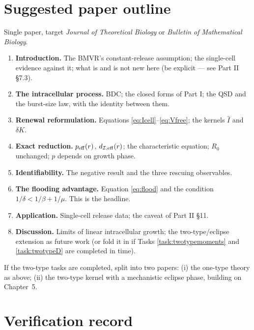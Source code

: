 \documentclass[11pt]{article}
\newcommand{\Ihat}{\widehat{I}}
\newcommand{\Icell}{\mathcal{I}}
\theoremstyle{plain}
\theoremstyle{definition}
\theoremstyle{remark}
\begin{document}
\section{Suggested paper outline}

Single paper, target \textit{Journal of Theoretical Biology} or
\textit{Bulletin of Mathematical Biology}.

\begin{enumerate}[leftmargin=1.8em,itemsep=0.2em]
\item \textbf{Introduction.} The BMVR's constant-release assumption; the single-cell
evidence against it; what is and is not new here (be explicit --- see Part II \S7.3).
\item \textbf{The intracellular process.} BDC; the closed forms of Part I; the QSD and
the burst-size law, with the identity between them.
\item \textbf{Renewal reformulation.} Equations \eqref{eq:Icell}--\eqref{eq:Vfree};
the kernels $\Ihat$ and $\delta K$.
\item \textbf{Exact reduction.} $p_{\rm eff}(r)$, $d_{\Icell,{\rm eff}}(r)$; the
characteristic equation; $R_0$ unchanged; $p$ depends on growth phase.
\item \textbf{Identifiability.} The negative result and the three rescuing observables.
\item \textbf{The flooding advantage.} Equation \eqref{eq:flood} and the condition
$1/\delta<1/\beta+1/\mu$. This is the headline.
\item \textbf{Application.} Single-cell release data; the caveat of Part II \S11.
\item \textbf{Discussion.} Limits of linear intracellular growth; the two-type/eclipse
extension as future work (or fold it in if Tasks \ref{task:twotypemoments} and
\ref{task:twotypeD} are completed in time).
\end{enumerate}

If the two-type tasks are completed, split into two papers: (i) the one-type theory as
above; (ii) the two-type kernel with a mechanistic eclipse phase, building on Chapter~5.

\appendix
\section{Verification record}
\end{document}
